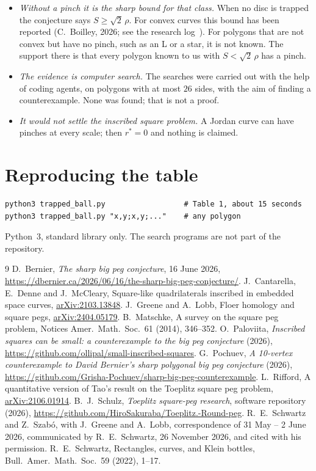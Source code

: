 \documentclass[11pt,a4paper]{article}
\theoremstyle{definition}\newtheorem{definition}{Definition}
\theoremstyle{remark}\newtheorem{remark}{Remark}
\begin{document}
\begin{itemize}
\item \emph{Without a pinch it is the sharp bound for that class.} When no disc
is trapped the conjecture says $S\ge\sqrt2\,\rho$. For convex curves this bound
has been reported (C.~Boilley, 2026; see the research log~\cite{schulz}). For
polygons that are not convex but have no pinch, such as an L or a star, it is
not known. The support there is that every polygon known to us with
$S<\sqrt2\,\rho$ has a pinch.
\item \emph{The evidence is computer search.} The searches were carried out with
the help of coding agents, on polygons with at most $26$ sides, with the aim of
finding a counterexample. None was found; that is not a proof.
\item \emph{It would not settle the inscribed square problem.} A Jordan curve
can have pinches at every scale; then $r^*=0$ and nothing is claimed.
\end{itemize}

\section{Reproducing the table}

\begin{verbatim}
python3 trapped_ball.py                  # Table 1, about 15 seconds
python3 trapped_ball.py "x,y;x,y;..."    # any polygon
\end{verbatim}
Python~3, standard library only. The search programs are not part of the
repository.

\begin{thebibliography}{9}\small
{} D.~Bernier, \emph{The sharp big peg conjecture}, 16 June 2026,
\url{https://dbernier.ca/2026/06/16/the-sharp-big-peg-conjecture/}.
 J.~Cantarella, E.~Denne and J.~McCleary, Square-like quadrilaterals
inscribed in embedded space curves, \href{https://arxiv.org/abs/2103.13848}{arXiv:2103.13848}.
 J.~Greene and A.~Lobb, Floer homology and square pegs,
\href{https://arxiv.org/abs/2404.05179}{arXiv:2404.05179}.
 B.~Matschke, A survey on the square peg problem,
Notices Amer.\ Math.\ Soc.\ 61 (2014), 346--352.
 O.~Paloviita, \emph{Inscribed squares can be small: a
counterexample to the big peg conjecture} (2026),
\url{https://github.com/ollipal/small-inscribed-squares}.
 G.~Pochuev, \emph{A 10-vertex counterexample to David
Bernier's sharp polygonal big peg conjecture} (2026),
\url{https://github.com/Grisha-Pochuev/sharp-big-peg-counterexample}.
 L.~Rifford, A quantitative version of Tao's result on the
Toeplitz square peg problem, \href{https://arxiv.org/abs/2106.01914}{arXiv:2106.01914}.
 B.~J.~Schulz, \emph{Toeplitz square-peg research}, software repository (2026),
\url{https://github.com/HiroSakuraba/Toeplitz.-Round-peg}.
 R.~E.~Schwartz and Z.~Szab\'o, with J.~Greene and A.~Lobb,
correspondence of 31 May -- 2 June 2026, communicated by R.~E.~Schwartz,
26 November 2026, and cited with his permission.
 R.~E.~Schwartz, Rectangles, curves, and Klein bottles,
Bull.\ Amer.\ Math.\ Soc.\ 59 (2022), 1--17.
\end{thebibliography}
\end{document}

